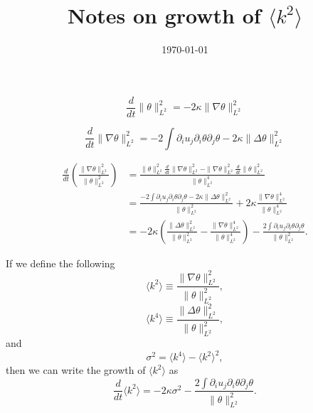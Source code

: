 \documentclass[12pt]{article}
\begin{document}
\title{Notes on growth of $\langle k^2 \rangle$}
\author{}
\date{\today}

\maketitle


\begin{equation}
\frac{d}{dt}\|\theta\|_{L^{2}}^2=  - 2\kappa \|\nabla \theta\|_{L^{2}}^2
\end{equation}

\begin{equation}
\frac{d}{dt}\|\nabla\theta\|_{L^{2}}^2= - 2\int \partial_{i}u_{j}\partial_{i}\theta\partial_{j}\theta - 2\kappa \|\Delta\theta\|_{L^{2}}^2
\end{equation}

\begin{subequations}
\begin{align}
\frac{d}{dt}\left(\frac{\|\nabla\theta\|_{L^{2}}^2}{\|\theta\|_{L^{2}}^2}\right) &= \frac{\|\theta\|_{L^{2}}^2\frac{d}{dt}\|\nabla\theta\|_{L^{2}}^2-\|\nabla\theta\|_{L^{2}}^2\frac{d}{dt}\|\theta\|_{L^{2}}^2}{\|\theta\|_{L^{2}}^4}\\
&= \frac{-2\int \partial_{i}u_{j}\partial_{i}\theta\partial_{j}\theta - 2\kappa \|\Delta\theta\|_{L^{2}}^2}{\|\theta\|_{L^{2}}^2}+2\kappa\frac{\|\nabla\theta\|_{L^{2}}^4}{\|\theta\|_{L^{2}}^4} \\
&=-2\kappa\left(\frac{\|\Delta\theta\|_{L^{2}}^2}{\|\theta\|_{L^{2}}^2} - \frac{\|\nabla\theta\|_{L^{2}}^4}{\|\theta\|_{L^{2}}^4} \right) - \frac{2\int \partial_{i}u_{j}\partial_{i}\theta\partial_{j}\theta }{\|\theta\|_{L^{2}}^2}.
\end{align}
\end{subequations}

If we define the following
\begin{equation}
\langle k^2 \rangle \equiv \frac{\|\nabla\theta\|_{L^{2}}^2}{\|\theta\|_{L^{2}}^2},
\end{equation}
\begin{equation}
\langle k^4 \rangle \equiv \frac{\|\Delta\theta\|_{L^{2}}^2}{\|\theta\|_{L^{2}}^2},
\end{equation}
and
\begin{equation}
\sigma^2= \langle k^4 \rangle - \langle k^2 \rangle^2,
\end{equation}
then we can write the growth of $\langle k^2\rangle$ as
\begin{equation}
\frac{d}{dt}\langle k^2 \rangle  =  -2\kappa\sigma^{2}- \frac{2\int \partial_{i}u_{j}\partial_{i}\theta\partial_{j}\theta }{\|\theta\|_{L^{2}}^2}.
\end{equation} 
\end{document}
